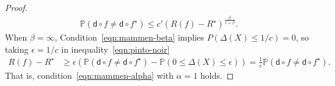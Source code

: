 \documentclass[10pt,a4paper]{amsart}
\renewcommand{\P}{\mathbb{P}} %
\newcommand{\pred}{\mathsf{d}}  %
\newcommand{\prn}[1]{\left({#1}\right)} %
\begin{document}
\begin{proof}
\begin{align*}
    \P(\pred \circ f \neq \pred \circ f^\star)
    \leq c' (R(f) - R^\star)^{\frac{\beta}{1+\beta}}.
  \end{align*}
  When $\beta = \infty$,
  Condition~\eqref{eqn:mammen-beta}
  implies $P(\Delta(X) \leq 1/c) = 0$,
  so taking $\epsilon =1/c$ in inequality~\eqref{eqn:pinto-noir}
  \begin{align*}
    R(f) - R^\star &\geq \epsilon \prn{\mathbb{P}(\pred \circ f \neq \pred \circ f^\star) - \mathbb{P}(0 \leq \Delta(X) \leq \epsilon)} = \frac 1 c \mathbb{P}(\pred \circ f \neq \pred \circ f^\star).
  \end{align*}
  That is, condition~\eqref{eqn:mammen-alpha} with $\alpha = 1$ holds.
\end{proof}
\end{document}
